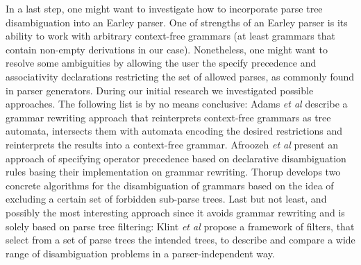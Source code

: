 \begin{isabellebody}
\begin{isamarkuptext}
In a last step, one might want to investigate how to incorporate parse tree disambiguation into an
Earley parser. One of strengths of an Earley parser is its ability to work with arbitrary context-free
grammars (at least grammars that contain non-empty derivations in our case). Nonetheless, one might
want to resolve some ambiguities by allowing the user the specify precedence and associativity declarations
restricting the set of allowed parses, as commonly found in parser generators. During our initial
research we investigated possible approaches. The following list is by no means conclusive:
Adams \textit{et al} \cite{Adams:2017} describe a grammar rewriting approach that reinterprets context-free
grammars as tree automata, intersects them with automata encoding the desired restrictions and reinterprets
the results into a context-free grammar. Afroozeh \textit{et al} \cite{Afroozeh:2013} present an approach
of specifying operator precedence based on declarative disambiguation rules basing their implementation
on grammar rewriting. Thorup \cite{Thorup:1996} develops two concrete algorithms for the disambiguation of
grammars based on the idea of excluding a certain set of forbidden sub-parse trees. Last but not least,
and possibly the most interesting approach since it avoids grammar rewriting and is solely based on parse
tree filtering: Klint \textit{et al} \cite{Klint:1997} propose a framework of filters, that select from
a set of parse trees the intended trees, to describe and compare a wide range of disambiguation problems
in a parser-independent way.%
\end{isamarkuptext}\isamarkuptrue%
%
\isadelimtheory
%
\endisadelimtheory
%
\isatagtheory
%
\endisatagtheory
{\isafoldtheory}%
%
\isadelimtheory
%
\endisadelimtheory
%
\end{isabellebody}%
\endinput
